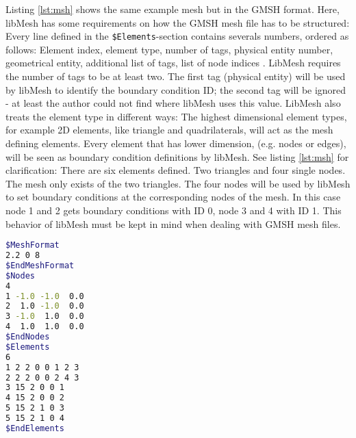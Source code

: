    Listing \ref{lst:msh} shows the same example mesh but in the GMSH format. Here, libMesh has some requirements on how the GMSH mesh file has to be structured: Every line defined in the \texttt{\$Elements}-section contains severals numbers, ordered as follows: Element index, element type, number of tags, physical entity number, geometrical entity, additional list of tags, list of node indices \cite{gmsh-manual}. LibMesh requires the number of tags to be at least two. The first tag (physical entity) will be used by libMesh to identify the boundary condition ID; the second tag will be ignored - at least the author could not find where libMesh uses this value. LibMesh also treats the element type in different ways: The highest dimensional element types, for example 2D elements, like triangle and quadrilaterals, will act as the mesh defining elements. Every element that has lower dimension, (e.g. nodes or edges), will be seen as boundary condition definitions by libMesh. See listing \ref{lst:msh} for clarification: There are six elements defined. Two triangles and four single nodes. The mesh only exists of the two triangles. The four nodes will be used by libMesh to set boundary conditions at the corresponding nodes of the mesh. In this case node 1 and 2 gets boundary conditions with ID 0, node 3 and 4 with ID 1. This behavior of libMesh must be kept in mind when dealing with GMSH mesh files.
\begin{lstlisting}[caption=Example GMSH mesh file,label=lst:msh,language=bash,keepspaces=true]
$MeshFormat
2.2 0 8
$EndMeshFormat
$Nodes
4
1 -1.0 -1.0  0.0
2  1.0 -1.0  0.0
3 -1.0  1.0  0.0
4  1.0  1.0  0.0
$EndNodes
$Elements
6
1 2 2 0 0 1 2 3
2 2 2 0 0 2 4 3
3 15 2 0 0 1
4 15 2 0 0 2
5 15 2 1 0 3
5 15 2 1 0 4
$EndElements
\end{lstlisting}


